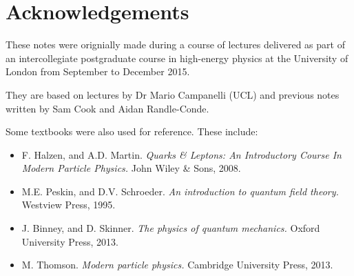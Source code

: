 \chapter*{Acknowledgements}
These notes were orignially made during a course of lectures delivered as part of an intercollegiate postgraduate course in high-energy physics at the University of London from September to December 2015.

They are based on lectures by Dr Mario Campanelli (UCL) and previous notes written by Sam Cook and Aidan Randle-Conde.

Some textbooks were also used for reference. These include:
\begin{itemize}
  \item F. Halzen, and A.D. Martin. \textsl{Quarks \& Leptons: An Introductory Course In Modern Particle Physics.} John Wiley & Sons, 2008.
  \item M.E. Peskin, and D.V. Schroeder. \textsl{An introduction to quantum field theory.} Westview Press, 1995.
  \item J. Binney, and D. Skinner. \textsl{The physics of quantum mechanics.} Oxford University Press, 2013.
  \item M. Thomson. \textsl{Modern particle physics.} Cambridge University Press, 2013.
\end{itemize}
